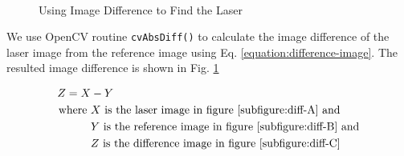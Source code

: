 \begin{figure}[h!]
\centering
{} \hfill
{} \\
 \hfill
\caption{Using Image Difference to Find the Laser}
\label{figure:difference-image}
\end{figure}

We use OpenCV routine \texttt{cvAbsDiff()} to calculate the image difference
of the laser image from the reference image using Eq.
\ref{equation:difference-image}. The resulted image difference is shown in
Fig. \ref{figure:difference-image}

\begin{align}
\label{equation:difference-image}
Z = X &- Y \\
\text{where}~
&X~ \text{is the laser image in figure \ref{subfigure:diff-A} and} \notag \\
&Y~ \text{is the reference image in figure \ref{subfigure:diff-B} and} \notag \\
&Z~ \text{is the difference image in figure \ref{subfigure:diff-C}} \notag
\end{align}

